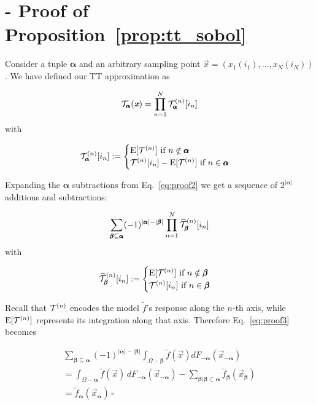 \documentclass[review, twocolumn]{svjour3}          %
\begin{document}
\section{- Proof of Proposition~\ref{prop:tt_sobol}} \label{app:proposition}

Consider a tuple $\pmb{\alpha}$ and an arbitrary sampling point $\vec{x} = (x_1(i_1), \dots, x_N(i_N))$. We have defined our TT approximation as

\begin{equation} \label{eq:proof1}
\set{T}_{\pmb{\alpha}}(\vec{x}) = \prod_{n=1}^N \set{T}^{(n)}_{\pmb{\alpha}}[i_n]
\end{equation}
%
with

\begin{equation} \label{eq:proof2}
\mathcal{T}^{(n)}_{\pmb{\alpha}}[i_n] :=
\begin{cases}
\operatorname{E}[\mathcal{T}^{(n)}] \mbox{ if } n \notin \pmb{\alpha} \\
\mathcal{T}^{(n)}[i_n] - \operatorname{E}[\mathcal{T}^{(n)}] \mbox{ if } n \in \pmb{\alpha}
\end{cases}
\end{equation}

Expanding the $\pmb{\alpha}$ subtractions from Eq.~\ref{eq:proof2} we get a sequence of $2^{|\pmb{\alpha}|}$ additions and subtractions:

\begin{equation} \label{eq:proof3}
\sum_{\pmb{\beta} \subseteq \pmb{\alpha}} (-1)^{|\pmb{\alpha}| - |\pmb{\beta}|} \prod_{n=1}^N \widehat{\mathcal{T}}^{(n)}_{\pmb{\beta}}[i_n]
\end{equation}
%
with

\begin{equation}
\widehat{\mathcal{T}}_{\pmb{\beta}}^{(n)}[i_n] :=
\begin{cases}
\operatorname{E}[\mathcal{T}^{(n)}] \mbox{ if } n \notin \pmb{\beta} \\
\mathcal{T}^{(n)}[i_n] \mbox{ if } n \in \pmb{\beta}
\end{cases}
\end{equation}

Recall that $\mathcal{T}^{(n)}$ encodes the model $\tilde{f}$'s response along the $n$-th axis, while $\operatorname{E}[\mathcal{T}^{(n)}]$ represents its integration along that axis. Therefore Eq.~\ref{eq:proof3} becomes

\begin{equation}
\begin{split}
\sum_{\pmb{\beta} \subseteq \pmb{\alpha}} (-1)^{|\pmb{\alpha}| - |\pmb{\beta}|} \int_{\Omega - \pmb{\beta}} \tilde{f}(\vec{x}) dF_{-\pmb{\alpha}}(\vec{x}_{-\pmb{\alpha}}) \\
= \int_{\Omega-{\pmb{\alpha}}} \tilde{f}(\vec{x}) \, dF_{-\pmb{\alpha}}(\vec{x}_{-\pmb{\alpha}}) - \sum_{\pmb{\beta} | \pmb{\beta} \subset \pmb{\alpha}} \tilde{f}_{\pmb{\beta}}(\vec{x}_{\pmb{\beta}}) \\
= \tilde{f}_{\pmb{\alpha}}(\vec{x}_{\pmb{\alpha}}) \, \square
\end{split}
\end{equation}
\end{document}
